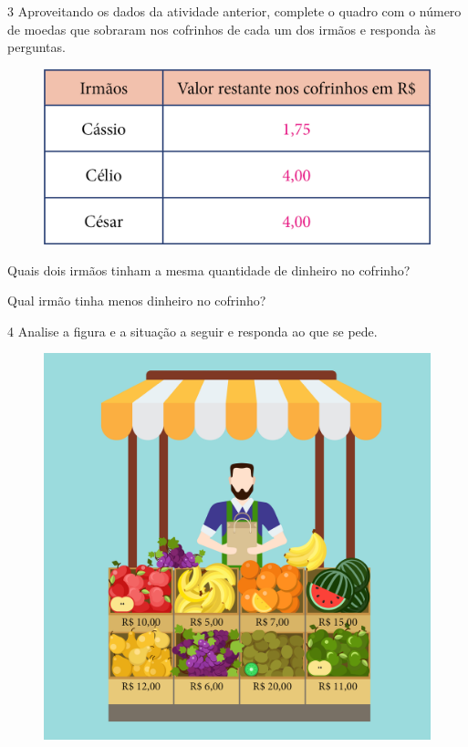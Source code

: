 
\num{3} Aproveitando os dados da atividade anterior, complete o quadro com o número de moedas que sobraram nos cofrinhos de cada um dos irmãos e responda às perguntas.

\begin{figure}[htpb!]
\centering
\includegraphics[width=.6\textwidth]{./media/image77.png}
\end{figure}

\begin{escolha}[itemsep=-5pt]
\item Quais dois irmãos tinham a mesma quantidade de dinheiro no cofrinho?

\item Qual irmão tinha menos dinheiro no cofrinho?
\end{escolha}

\num{4} Analise a figura e a situação a seguir e responda ao que se pede.



\begin{figure}[htpb!]
\centering
\includegraphics[width=.6\textwidth]{./media/image65.png}
\end{figure}

